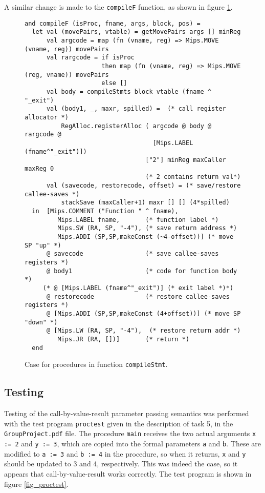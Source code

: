\noindent
A similar change is made to the \verb|compileF| function, as shown in figure
\ref{fig_compileF}.

\begin{figure}[H]
  \begin{lstlisting}[style=MLStyle]
and compileF (isProc, fname, args, block, pos) =
  let val (movePairs, vtable) = getMovePairs args [] minReg
      val argcode = map (fn (vname, reg) => Mips.MOVE (vname, reg)) movePairs
      val rargcode = if isProc
                     then map (fn (vname, reg) => Mips.MOVE (reg, vname)) movePairs
                     else []
      val body = compileStmts block vtable (fname ^ "_exit")
      val (body1, _, maxr, spilled) =  (* call register allocator *)
          RegAlloc.registerAlloc ( argcode @ body @ rargcode @
                                   [Mips.LABEL (fname^"_exit")])
                                 ["2"] minReg maxCaller maxReg 0
                                 (* 2 contains return val*)
      val (savecode, restorecode, offset) = (* save/restore callee-saves *)
          stackSave (maxCaller+1) maxr [] [] (4*spilled)
  in  [Mips.COMMENT ("Function " ^ fname),
         Mips.LABEL fname,       (* function label *)
         Mips.SW (RA, SP, "-4"), (* save return address *)
         Mips.ADDI (SP,SP,makeConst (~4-offset))] (* move SP "up" *)
      @ savecode                 (* save callee-saves registers *)
      @ body1                    (* code for function body *)
     (* @ [Mips.LABEL (fname^"_exit")] (* exit label *)*)
      @ restorecode              (* restore callee-saves registers *)
      @ [Mips.ADDI (SP,SP,makeConst (4+offset))] (* move SP "down" *)
      @ [Mips.LW (RA, SP, "-4"),  (* restore return addr *)
         Mips.JR (RA, [])]       (* return *)
  end
  \end{lstlisting}
  \caption{Case for procedures in function \texttt{compileStmt}.}
  \label{fig_compileF}
\end{figure}


\subsection{Testing}
Testing of the call-by-value-result parameter passing semantics was performed
with the test program \verb|proctest| given in the description of task 5, in the
\verb|GroupProject.pdf| file. The procedure \verb|main| receives the two actual
arguments \verb|x := 2| and \verb|y := 3|, which are copied into the formal
parameters \verb|a| and \verb|b|. These are modified to \verb|a := 3| and
\verb|b := 4| in the procedure, so when it returns, \verb|x| and \verb|y| should
be updated to 3 and 4, respectively. This was indeed the case, so it appears
that call-by-value-result works correctly. The test program is shown in figure
\ref{fig_proctest}.

